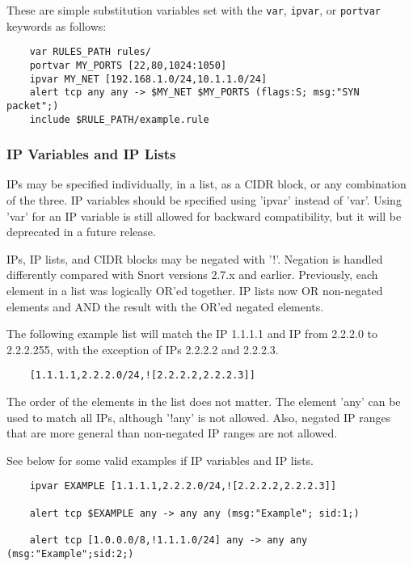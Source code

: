 \documentclass[english]{report}
\begin{document}
These are simple substitution variables set with the {\tt var}, {\tt ipvar}, or
{\tt portvar} keywords as follows:

\begin{verbatim}
    var RULES_PATH rules/
    portvar MY_PORTS [22,80,1024:1050]
    ipvar MY_NET [192.168.1.0/24,10.1.1.0/24]
    alert tcp any any -> $MY_NET $MY_PORTS (flags:S; msg:"SYN packet";)
    include $RULE_PATH/example.rule
\end{verbatim}

\subsubsection{IP Variables and IP Lists}

IPs may be specified individually, in a list, as a CIDR block, or any
combination of the three.  IP variables should be specified using 'ipvar'
instead of 'var'.  Using 'var' for an IP variable is still allowed for backward
compatibility, but it will be deprecated in a future release.

IPs, IP lists, and CIDR blocks may be negated with '!'.  Negation is handled
differently compared with Snort versions 2.7.x and earlier.  Previously, each
element in a list was logically OR'ed together.  IP lists now OR non-negated
elements and AND the result with the OR'ed negated elements.  

The following example list will match the IP 1.1.1.1 and IP from 2.2.2.0 to
2.2.2.255, with the exception of IPs 2.2.2.2 and 2.2.2.3.

\begin{verbatim}
    [1.1.1.1,2.2.2.0/24,![2.2.2.2,2.2.2.3]] 
\end{verbatim}

The order of the elements in the list does not matter.  The element 'any' can
be used to match all IPs, although '!any' is not allowed.  Also, negated IP
ranges that are more general than non-negated IP ranges are not allowed.  

See below for some valid examples if IP variables and IP lists.

\begin{verbatim}
    ipvar EXAMPLE [1.1.1.1,2.2.2.0/24,![2.2.2.2,2.2.2.3]] 
    
    alert tcp $EXAMPLE any -> any any (msg:"Example"; sid:1;)

    alert tcp [1.0.0.0/8,!1.1.1.0/24] any -> any any (msg:"Example";sid:2;)
\end{verbatim}
\end{document}
